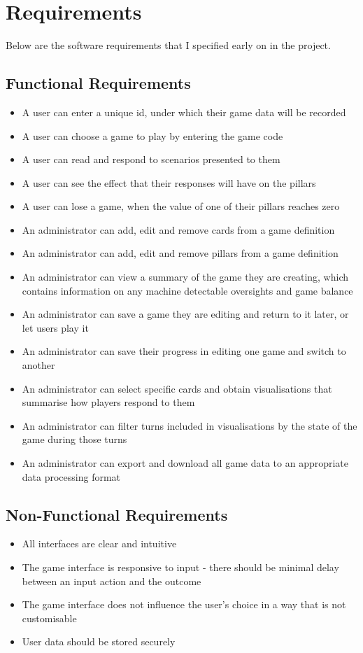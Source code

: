\chapter{Requirements}

Below are the software requirements that I specified early on in the project.

\section{Functional Requirements}

\begin{itemize}
        \item A user can enter a unique id, under which their game data will be recorded
        \item A user can choose a game to play by entering the game code
        \item A user can read and respond to scenarios presented to them
        \item A user can see the effect that their responses will have on the pillars
        \item A user can lose a game, when the value of one of their pillars reaches zero
        \item An administrator can add, edit and remove cards from a game definition
        \item An administrator can add, edit and remove pillars from a game definition
        \item An administrator can view a summary of the game they are creating, which contains information on any machine detectable oversights and game balance 
        \item An administrator can save a game they are editing and return to it later, or let users play it
        \item An administrator can save their progress in editing one game and switch to another
        \item An administrator can select specific cards and obtain visualisations that summarise how players respond to them
        \item An administrator can filter turns included in visualisations by the state of the game during those turns
        \item An administrator can export and download all game data to an appropriate data processing format
\end{itemize}

\section{Non-Functional Requirements}

\begin{itemize}
    \item All interfaces are clear and intuitive
    \item The game interface is responsive to input - there should be minimal delay between an input action and the outcome
    \item The game interface does not influence the user's choice in a way that is not customisable
    \item User data should be stored securely
\end{itemize}